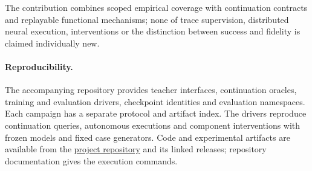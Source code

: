 \documentclass[10pt]{article}
\begin{document}
The contribution combines scoped empirical
coverage with continuation contracts and replayable functional mechanisms;
none of trace supervision, distributed neural execution, interventions or
the distinction between success and fidelity is claimed individually new.

\paragraph{Reproducibility.}
The accompanying repository provides teacher interfaces, continuation
oracles, training and evaluation drivers, checkpoint identities and
evaluation namespaces. Each campaign has a separate protocol and artifact
index. The drivers reproduce continuation queries, autonomous executions
and component interventions with frozen models and fixed case generators.
Code and experimental artifacts are available from the
\href{https://github.com/mrioswilson/distributed-coloring-learning}{project repository}
and its linked releases; repository documentation gives the execution commands.


\end{document}

